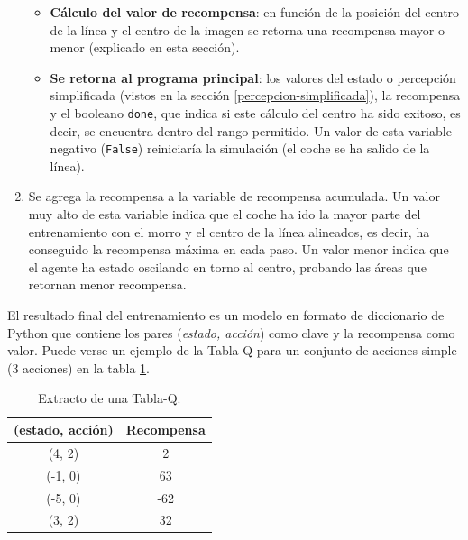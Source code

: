 \begin{enumerate}
\begin{itemize}
        \item \textbf{Cálculo del valor de recompensa}: en función de la posición del centro de la línea y el centro de la imagen se retorna una recompensa mayor o menor (explicado en esta sección).\\
        \item \textbf{Se retorna al programa principal}: los valores del estado o percepción simplificada (vistos en la sección \ref{percepcion-simplificada}), la recompensa y el booleano \texttt{done}, que indica si este cálculo del centro ha sido exitoso, es decir, se encuentra dentro del rango permitido. Un valor de esta variable negativo (\texttt{False}) reiniciaría la simulación (el coche se ha salido de la línea).\\
    \end{itemize}
    \item Se agrega la recompensa a la variable de recompensa acumulada. Un valor muy alto de esta variable indica que el coche ha ido la mayor parte del entrenamiento con el morro y el centro de la línea alineados, es decir, ha conseguido la recompensa máxima en cada paso. Un valor menor indica que el agente ha estado oscilando en torno al centro, probando las áreas que retornan menor recompensa.\\
\end{enumerate}


El resultado final del entrenamiento es un modelo en formato de diccionario de Python que contiene los pares (\textit{estado, acción}) como clave y la recompensa como valor. Puede verse un ejemplo de la Tabla-Q para un conjunto de acciones simple (3 acciones) en la tabla \ref{tabla-q}.

\begin{table}[ht!]
\centering
\begin{tabular}{|c|c|}
\hline
\rowcolor[HTML]{C0C0C0} 
\textbf{(estado, acción)} & \textbf{Recompensa} \\ \hline
(4, 2)                     & 2                   \\ \hline
(-1, 0)                    & 63                  \\ \hline
(-5, 0)                    & -62                \\ \hline
(3, 2)                     & 32                  \\ \hline
\end{tabular}
\caption{Extracto de una Tabla-Q.}\label{tabla-q}
\end{table}

